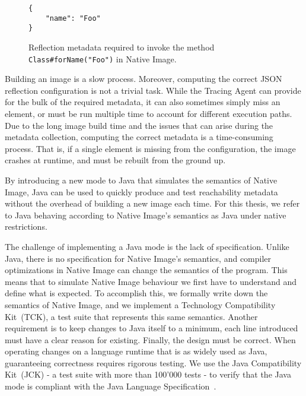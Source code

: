 \begin{figure}[ht]
    \centering
\begin{lstlisting}
{
    "name": "Foo"
}
\end{lstlisting}
    \caption{Reflection metadata required to invoke the method \texttt{Class\#forName("Foo")} in Native Image.}
    \label{fig:foo_metadata}
\end{figure}


Building an image  is a slow process. Moreover, computing the correct JSON reflection configuration is  not a trivial task. While the Tracing Agent can provide for the bulk of the required metadata, it can also sometimes simply miss an element, or must be run multiple time to account for different execution paths.
Due to the long image build time and the issues that can arise during the metadata collection, computing the correct metadata is a time-consuming process. That is, if a single element is missing from the configuration, the image crashes at runtime, and must be rebuilt from the ground up.


By introducing a new mode to Java that simulates the semantics of Native Image, Java can be used to quickly produce and test reachability metadata without the overhead of building a new image each time. For this thesis, we refer to Java behaving according to Native Image's semantics as Java under native restrictions.

The challenge of implementing a Java mode is the lack of specification. Unlike Java, there is no specification for Native Image's semantics, and compiler optimizations in Native Image can change the semantics of the program. This means that to simulate Native Image behaviour we first have to understand and define what is expected. To accomplish this, we formally write down the semantics of Native Image, and we implement a Technology Compatibility Kit~(TCK), a test suite that represents this same semantics.
Another requirement is to keep changes to Java itself to a minimum, each line introduced must have a clear reason for existing.
Finally, the design must be correct. When operating changes on a language runtime that is as widely used as Java, guaranteeing correctness requires rigorous testing. We use the Java Compatibility Kit~(JCK) - a test suite with more than 100'000 tests - to verify that the Java mode is compliant with the Java Language Specification~\cite{noauthor_java_nodate-2}.

